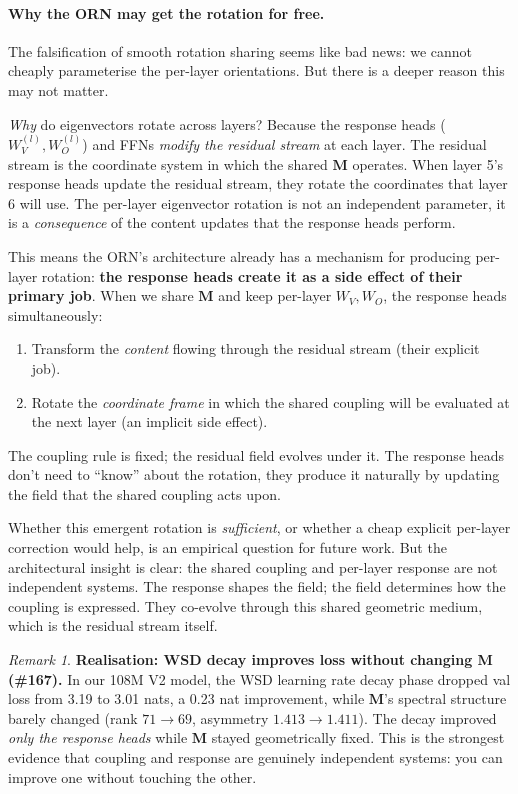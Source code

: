 \documentclass[11pt, a4paper]{article}
\newcommand{\M}{\mathbf{M}}
\theoremstyle{remark}
\newtheorem*{remark}{Remark}
\begin{document}
\paragraph{Why the ORN may get the rotation for free.}
The falsification of smooth rotation sharing seems like bad news: we cannot cheaply parameterise the per-layer orientations.
But there is a deeper reason this may not matter.

\emph{Why} do eigenvectors rotate across layers?
Because the response heads ($W_V^{(l)}, W_O^{(l)}$) and FFNs \emph{modify the residual stream} at each layer.
The residual stream is the coordinate system in which the shared $\M$ operates.
When layer 5's response heads update the residual stream, they rotate the coordinates that layer 6 will use.
The per-layer eigenvector rotation is not an independent parameter, it is a \emph{consequence} of the content updates that the response heads perform.

This means the ORN's architecture already has a mechanism for producing per-layer rotation: \textbf{the response heads create it as a side effect of their primary job}.
When we share $\M$ and keep per-layer $W_V, W_O$, the response heads simultaneously:
\begin{enumerate}[nosep]
    \item Transform the \emph{content} flowing through the residual stream (their explicit job).
    \item Rotate the \emph{coordinate frame} in which the shared coupling will be evaluated at the next layer (an implicit side effect).
\end{enumerate}
The coupling rule is fixed; the residual field evolves under it.
The response heads don't need to ``know'' about the rotation, they produce it naturally by updating the field that the shared coupling acts upon.

Whether this emergent rotation is \emph{sufficient}, or whether a cheap explicit per-layer correction would help, is an empirical question for future work.
But the architectural insight is clear: the shared coupling and per-layer response are not independent systems.
The response shapes the field; the field determines how the coupling is expressed.
They co-evolve through this shared geometric medium, which is the residual stream itself.

\begin{remark}
\textbf{Realisation: WSD decay improves loss without changing M (\#167).}
In our 108M V2 model, the WSD learning rate decay phase dropped val loss from 3.19 to 3.01 nats, a 0.23 nat improvement, while $\M$'s spectral structure barely changed (rank $71 \to 69$, asymmetry $1.413 \to 1.411$).
The decay improved \emph{only the response heads} while $\M$ stayed geometrically fixed.
This is the strongest evidence that coupling and response are genuinely independent systems: you can improve one without touching the other.
\end{remark}
\end{document}

